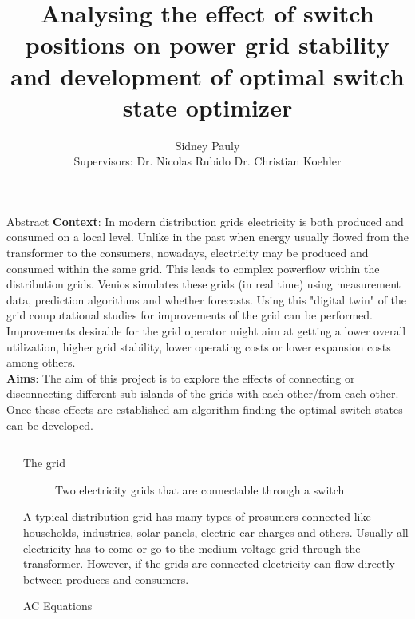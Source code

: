 \documentclass[final]{beamer}
\title{Analysing the effect of switch positions on power grid stability and development of optimal switch state optimizer}
\author{Sidney Pauly\inst{1} \inst{2}\\ Supervisors: Dr. Nicolas Rubido\inst{1} Dr. Christian Koehler\inst{2}}
\institute[shortinst]{\inst{1} University of Aberdeen \samelineand \inst{2} Venios GmbH}
\newlength{\sepwidth}
\newlength{\colwidth}
\newcommand{\separatorcolumn}{\begin{column}{\sepwidth}\end{column}}
\begin{document}
\begin{frame}[t]

  \begin{block}{Abstract}
    \textbf{Context}: In modern distribution grids electricity is both produced and consumed on a local level.
    Unlike in the past when energy usually flowed from the transformer to the consumers, nowadays, electricity
    may be produced and consumed within the same grid. This leads to complex powerflow within the distribution
    grids. Venios simulates these grids (in real time) using measurement data, prediction algorithms and whether
    forecasts. Using this "digital twin" of the grid computational studies for improvements of the grid
    can be performed. Improvements desirable for the grid operator might aim at getting a lower overall utilization, higher
    grid stability, lower operating costs or lower expansion costs among others\autocite{Venios}.\\
    \textbf{Aims}: The aim of this project is to explore the effects of connecting or disconnecting different
    sub islands of the grids with each other/from each other. Once these effects are established am algorithm
    finding the optimal switch states can be developed.
  \end{block}

\begin{columns}[t]


\separatorcolumn

\begin{column}{\colwidth}

  \begin{block}{The grid}

    \begin{figure}
      \centering
      
      \caption{Two electricity grids that are connectable through a switch}
      \label{fig:simple_grid}
    \end{figure}

    A typical distribution grid has many types of prosumers connected like households, industries, solar panels, electric car charges and others.
    Usually all electricity has to come or go to the medium voltage grid through the transformer. However, if the grids are connected
    electricity can flow directly between produces and consumers.

  \end{block}

  \begin{alertblock}{AC Equations}


\end{alertblock}
\end{column}
\end{columns}
\end{frame}
\end{document}
